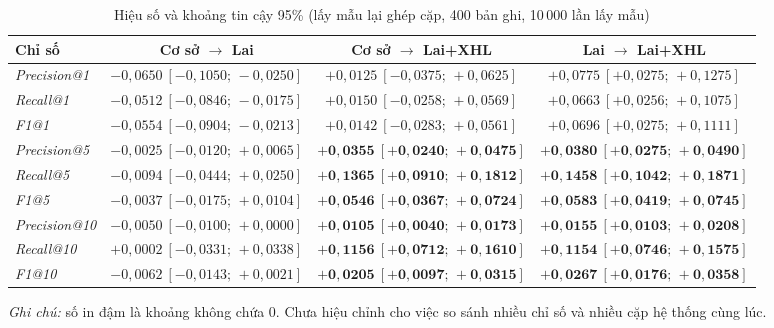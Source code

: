 \begin{table}[ht]
    \centering
    \caption{Hiệu số và khoảng tin cậy 95\% (lấy mẫu lại ghép cặp, 400 bản ghi, 10\,000 lần lấy mẫu)}
    \label{tab:bootstrap-v7}
    \begin{adjustbox}{width=\textwidth}
        \begin{tabular}{|l|c|c|c|}
            \hline
            \textbf{Chỉ số}       & \textbf{Cơ sở $\to$ Lai}             & \textbf{Cơ sở $\to$ Lai+XHL}        & \textbf{Lai $\to$ Lai+XHL}          \\
            \hline
            \textit{Precision@1}  & $-0{,}0650\ [-0{,}1050;\,-0{,}0250]$ & $+0{,}0125\ [-0{,}0375;\,+0{,}0625]$          & $+0{,}0775\ [+0{,}0275;\,+0{,}1275]$          \\
            \hline
            \textit{Recall@1}     & $-0{,}0512\ [-0{,}0846;\,-0{,}0175]$ & $+0{,}0150\ [-0{,}0258;\,+0{,}0569]$          & $+0{,}0663\ [+0{,}0256;\,+0{,}1075]$          \\
            \hline
            \textit{F1@1}         & $-0{,}0554\ [-0{,}0904;\,-0{,}0213]$ & $+0{,}0142\ [-0{,}0283;\,+0{,}0561]$          & $+0{,}0696\ [+0{,}0275;\,+0{,}1111]$          \\
            \hline
            \textit{Precision@5}  & $-0{,}0025\ [-0{,}0120;\,+0{,}0065]$ & $\mathbf{+0{,}0355\ [+0{,}0240;\,+0{,}0475]}$ & $\mathbf{+0{,}0380\ [+0{,}0275;\,+0{,}0490]}$ \\
            \hline
            \textit{Recall@5}     & $-0{,}0094\ [-0{,}0444;\,+0{,}0250]$ & $\mathbf{+0{,}1365\ [+0{,}0910;\,+0{,}1812]}$ & $\mathbf{+0{,}1458\ [+0{,}1042;\,+0{,}1871]}$ \\
            \hline
            \textit{F1@5}         & $-0{,}0037\ [-0{,}0175;\,+0{,}0104]$ & $\mathbf{+0{,}0546\ [+0{,}0367;\,+0{,}0724]}$ & $\mathbf{+0{,}0583\ [+0{,}0419;\,+0{,}0745]}$ \\
            \hline
            \textit{Precision@10} & $-0{,}0050\ [-0{,}0100;\,+0{,}0000]$ & $\mathbf{+0{,}0105\ [+0{,}0040;\,+0{,}0173]}$ & $\mathbf{+0{,}0155\ [+0{,}0103;\,+0{,}0208]}$ \\
            \hline
            \textit{Recall@10}    & $+0{,}0002\ [-0{,}0331;\,+0{,}0338]$ & $\mathbf{+0{,}1156\ [+0{,}0712;\,+0{,}1610]}$ & $\mathbf{+0{,}1154\ [+0{,}0746;\,+0{,}1575]}$ \\
            \hline
            \textit{F1@10}        & $-0{,}0062\ [-0{,}0143;\,+0{,}0021]$ & $\mathbf{+0{,}0205\ [+0{,}0097;\,+0{,}0315]}$ & $\mathbf{+0{,}0267\ [+0{,}0176;\,+0{,}0358]}$ \\
            \hline
        \end{tabular}
    \end{adjustbox}
    \parbox{\textwidth}{\small \textit{Ghi chú:} số in đậm là khoảng không chứa 0. Chưa hiệu chỉnh cho việc so sánh nhiều chỉ số và nhiều cặp hệ thống cùng lúc.}
\end{table}

